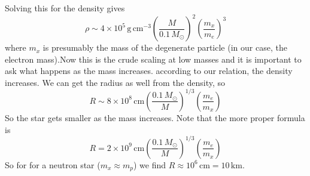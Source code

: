 \documentclass[10pt]{article}
\numberwithin{equation}{section}
\begin{document}
    Solving this for the density gives
    \begin{equation}
      \label{eq:324}
      \rho\sim 4\times 10^5\,\mathrm{g\,cm^{-3}}\left(\frac{M}{0.1\,M_
\odot}\right)^2\left(\frac{m_x}{m_e}\right)^3
    \end{equation}
    where $m_x$ is presumably the mass of the degenerate particle (in
    our case, the electron mass).Now this is the crude scaling at low 
masses and it is important to
    ask what happens as the mass increases. according to our relation,
    the density increases. We can get the radius as well from the
    density, so
    \begin{equation}
      \label{eq:325}
      R\sim 8\times 10^8\,\mathrm{cm}\left(\frac{0.1\,M_\odot}{M}\right)^
{1/3}\left(\frac{m_e}{m_x}\right)
    \end{equation}
    So the star gets smaller as the mass increases. Note that the more
    proper formula is
    \begin{equation}
      \label{eq:326}
      R=2\times 10^9\,\mathrm{cm}\left(\frac{0.1\,M_\odot}{M}\right)^
{1/3}\left(\frac{m_e}{m_x}\right)
    \end{equation}
    So for for a neutron star ($m_x\approx m_p$) we find $R\approx
    10^6\,\mathrm{cm}=10\,\mathrm{km}$.\\
\end{document}
